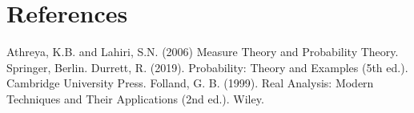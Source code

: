 \documentclass{article}
\begin{document}
\section{References}
Athreya, K.B. and Lahiri, S.N. (2006) Measure Theory and Probability Theory. Springer, Berlin. \newline \newline
Durrett, R. (2019). Probability: Theory and Examples (5th ed.). Cambridge University Press. \newline \newline
Folland, G. B. (1999). Real Analysis: Modern Techniques and Their Applications (2nd ed.). Wiley. \newline \newline 
\end{document}
